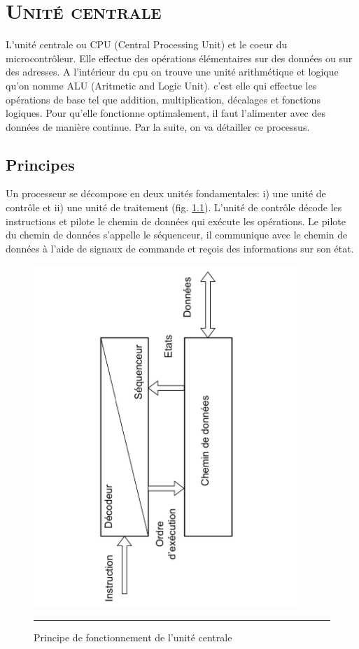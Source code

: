 \chapter{\textsc{Unité centrale}}

L'unité centrale ou CPU (Central Processing Unit) et le coeur du microcontrôleur. Elle effectue des opérations élémentaires sur des données ou sur des adresses. A l'intérieur du cpu on trouve une unité arithmétique et logique qu'on nomme ALU (Aritmetic and Logic Unit). c'est elle qui effectue les opérations de base tel que addition, multiplication, décalages et fonctions logiques. Pour qu'elle fonctionne optimalement, il faut l'alimenter avec des données de manière continue. Par la suite, on va détailler ce processus.

\section{Principes}

Un processeur se décompose en deux unités fondamentales: i) une unité de contrôle et ii) une unité de traitement  (fig. \ref{fig:cpu1}). L'unité de contrôle décode les instructions et pilote le chemin de données qui exécute les opérations. Le pilote du chemin de données s'appelle le séquenceur, il communique avec le chemin de données à l'aide de signaux de commande et reçois des informations sur son état. 

\begin{figure}[htb]
  \centering
  \includegraphics[angle=270, width=10cm,trim=100 1 100 1,clip]{./Figures/cpu/cpu1.pdf}
  \rule{35em}{0.5pt}
  \caption[cpu1]{Principe de fonctionnement de l'unité centrale}
  \label{fig:cpu1}
\end{figure}


